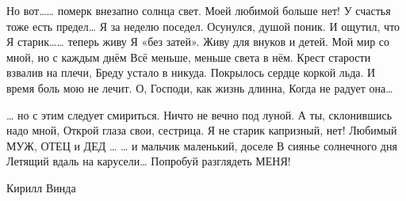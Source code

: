 Но вот…… померк внезапно солнца свет. Моей любимой больше нет! У счастья тоже
есть предел… Я за неделю поседел. Осунулся, душой поник. И ощутил, что Я
старик…… теперь живу Я «без затей». Живу для внуков и детей. Мой мир со мной,
но с каждым днём Всё меньше, меньше света в нём. Крест старости взвалив на
плечи, Бреду устало в никуда. Покрылось сердце коркой льда. И время боль мою не
лечит. О, Господи, как жизнь длинна, Когда не радует она…

… но с этим следует смириться. Ничто не вечно под луной. А ты, склонившись надо
мной, Открой глаза свои, сестрица. Я не старик капризный, нет! Любимый МУЖ,
ОТЕЦ и ДЕД … … и мальчик маленький, доселе В сиянье солнечного дня Летящий
вдаль на карусели… Попробуй разглядеть МЕНЯ!

Кирилл Винда
